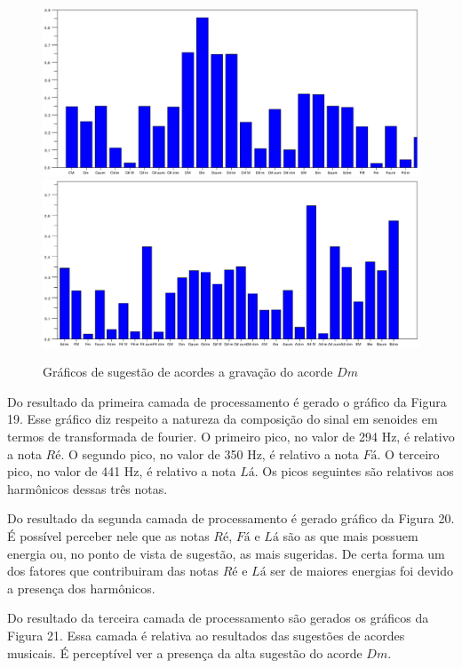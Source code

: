 \begin{figure}[h]
	\centering
		\includegraphics[keepaspectratio=true,scale=0.49]{figuras/Dm/acordes_1_Dm.eps}
		\includegraphics[keepaspectratio=true,scale=0.49]{figuras/Dm/acordes_2_Dm.eps}
	\caption{Gráficos de sugestão de acordes a gravação do acorde $Dm$}
\end{figure}
\newpage

Do resultado da primeira camada de processamento é gerado o gráfico da Figura 19. Esse gráfico diz respeito a natureza da composição do sinal em senoides em termos de transformada de fourier. O primeiro pico, no valor de 294 Hz, é relativo a nota $Ré$. O segundo pico, no valor de 350 Hz, é relativo a nota $Fá$. O terceiro pico, no valor de 441 Hz, é relativo a nota $Lá$. Os picos seguintes são relativos aos harmônicos dessas três notas.

Do resultado da segunda camada de processamento é gerado gráfico da Figura 20. É possível perceber nele que as notas $Ré$, $Fá$ e $Lá$ são as que mais possuem energia ou, no ponto de vista de sugestão, as mais sugeridas. De certa forma um dos fatores que contribuiram das notas $Ré$ e $Lá$ ser de maiores energias foi devido a presença dos harmônicos.

Do resultado da terceira camada de processamento são gerados os gráficos da Figura 21. Essa camada é relativa ao resultados das sugestões de acordes musicais. É perceptível ver a presença da alta sugestão do acorde $Dm$.

